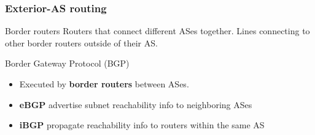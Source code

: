 
\subsubsection{Exterior-AS routing}

\begin{knBox}
    {Border routers}
    Routers that connect different ASes together. Lines connecting to other border routers outside of their AS.
\end{knBox}

\begin{definition}
    {Border Gateway Protocol (BGP)}

    \begin{itemize}
        \item Executed by \textbf{border routers} between ASes.
        \item \textbf{eBGP} advertise subnet reachability info to neighboring ASes
        \item \textbf{iBGP} propagate reachability info to routers within the same AS
    \end{itemize}
\end{definition}

